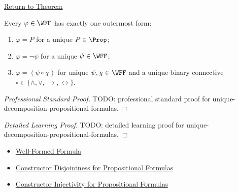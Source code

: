 \newpage
{}
\label{prf:unique-decomposition-propositional-formulas}

\begin{remark*}[Return]
\hyperref[thm:unique-decomposition-propositional-formulas]{Return to Theorem}
\end{remark*}

\begin{theorem*}
Every \(\varphi\in\WFF\) has exactly one outermost form:
\begin{enumerate}
\item \(\varphi=P\) for a unique \(P\in\Prop\);
\item \(\varphi=\neg\psi\) for a unique \(\psi\in\WFF\);
\item \(\varphi=(\psi\circ\chi)\) for unique \(\psi,\chi\in\WFF\) and a unique binary connective \(\circ\in\{\land,\lor,\to,\leftrightarrow\}\).
\end{enumerate}
\end{theorem*}

\begin{proof}[Professional Standard Proof]
\LRAProofBodyStart
TODO: professional standard proof for unique-decomposition-propositional-formulas.
\end{proof}

\begin{proof}[Detailed Learning Proof]
\LRAProofBodyStart
TODO: detailed learning proof for unique-decomposition-propositional-formulas.
\end{proof}

\begin{remark*}
\end{remark*}

\begin{dependencies}
\begin{itemize}
  \item \hyperref[def:well-formed-formula]{Well-Formed Formula}
  \item \hyperref[lem:constructor-disjointness-propositional-formulas]{Constructor Disjointness for Propositional Formulas}
  \item \hyperref[lem:constructor-injectivity-propositional-formulas]{Constructor Injectivity for Propositional Formulas}
\end{itemize}
\end{dependencies}

\clearpage
